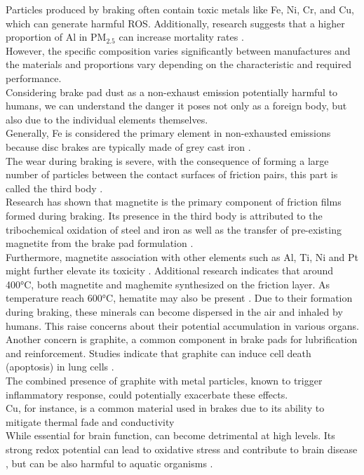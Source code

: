 Particles produced by braking often contain toxic metals like Fe, Ni, Cr, and Cu, which can generate harmful ROS. Additionally, research suggests that a higher proportion of Al in $\text{PM}_{2.5}$ can increase mortality rates \cite{kelly2012size}. \\
However, the specific composition varies significantly between manufactures and the materials and proportions vary depending on the characteristic and required performance. \\
Considering brake pad dust as a non-exhaust emission potentially harmful to humans, we can understand the danger it poses not only as a foreign body, but also due to the individual elements themselves. \\
Generally, Fe is considered the primary element in non-exhausted emissions because disc brakes are typically made of grey cast iron \cite{zemlik2022case}. \\
The wear during braking is severe, with the consequence of forming a large number of particles between the contact surfaces of friction pairs, this part is called the third body \cite{yao2023influence}. \\

Research has shown that magnetite is the primary component of friction films formed during braking. Its presence in the third body is attributed to the tribochemical oxidation of steel and iron as well as the transfer of pre-existing magnetite from the brake pad formulation \cite{yao2023influence}. \\
Furthermore, magnetite association with other elements such as Al, Ti, Ni and Pt might further elevate its toxicity \cite{ripley2024within}.
Additional research indicates that around 400°C, both magnetite and maghemite synthesized on the friction layer. As temperature reach 600°C, hematite may also be present \cite{hagino2023iron}.
Due to their formation during braking, these minerals can become dispersed in the air and inhaled by humans. This raise concerns about their potential accumulation in various organs. \\
Another concern is graphite, a common component in brake pads for lubrification and reinforcement.
Studies indicate that graphite can induce cell death (apoptosis) in lung cells \cite{zendehdel2023human}. \\ 
The combined presence of graphite with metal particles, known to trigger inflammatory response, could potentially exacerbate these effects. \\
Cu, for instance, is a common material used in brakes due to its ability to mitigate thermal fade and conductivity \cite{lee2013friction} \\
While essential for brain function, can become detrimental at high levels. Its strong redox potential can lead to oxidative stress and contribute to brain disease \cite{an2022role}, but can be also harmful to aquatic organisms \cite{lee2013friction}. \\


